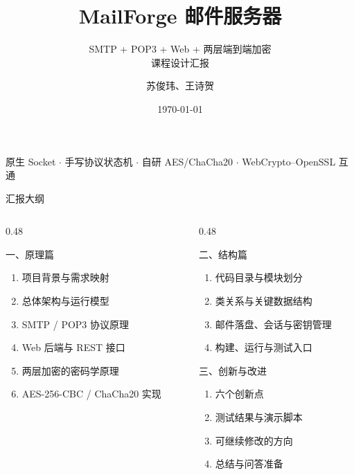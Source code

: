 \documentclass[aspectratio=169,10pt]{beamer}
\title[MailForge]{MailForge 邮件服务器}
\subtitle{SMTP + POP3 + Web + 两层端到端加密 \\ 课程设计汇报}
\author[苏俊玮、王诗贺]{苏俊玮、王诗贺}
\institute[计算机与网络课程设计]{计算机与网络课程设计 · 选题 18}
\date{\today}
\begin{document}
\begin{frame}
  \titlepage
  \vfill
  \begin{center}
    \small 原生 Socket $\cdot$ 手写协议状态机 $\cdot$ 自研 AES/ChaCha20 $\cdot$ WebCrypto--OpenSSL 互通
  \end{center}
\end{frame}
\begin{frame}{汇报大纲}
  \begin{columns}[T]
    \begin{column}{0.48\textwidth}
      \begin{block}{一、原理篇}
        \begin{enumerate}
          \item 项目背景与需求映射
          \item 总体架构与运行模型
          \item SMTP / POP3 协议原理
          \item Web 后端与 REST 接口
          \item 两层加密的密码学原理
          \item AES-256-CBC / ChaCha20 实现
        \end{enumerate}
      \end{block}
    \end{column}
    \begin{column}{0.48\textwidth}
      \begin{block}{二、结构篇}
        \begin{enumerate}
          \item 代码目录与模块划分
          \item 类关系与关键数据结构
          \item 邮件落盘、会话与密钥管理
          \item 构建、运行与测试入口
        \end{enumerate}
      \end{block}
      \begin{block}{三、创新与改进}
        \begin{enumerate}
          \item 六个创新点
          \item 测试结果与演示脚本
          \item 可继续修改的方向
          \item 总结与问答准备
        \end{enumerate}
      \end{block}
    \end{column}
  \end{columns}
\end{frame}
\end{document}
